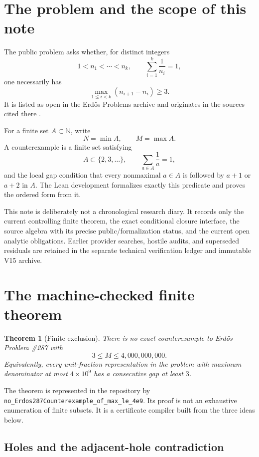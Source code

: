 \documentclass[11pt]{article}
\newtheorem{theorem}{Theorem}[section]
\theoremstyle{definition}
\newcommand{\N}{\mathbb N}
\newcommand{\1}{\mathbf 1}
\begin{document}
\tableofcontents

\section{The problem and the scope of this note}

The public problem asks whether, for distinct integers
\[
1<n_1<\cdots<n_k,\qquad \sum_{i=1}^k\frac1{n_i}=1,
\]
one necessarily has
\[
\max_{1\le i<k}(n_{i+1}-n_i)\ge3.
\]
It is listed as open in the Erd\H{o}s Problems archive and originates in the sources
cited there \cite{ErdosGraham1980,ErdosProblems287}.

For a finite set $A\subset\N$, write
\[
N=\min A,\qquad M=\max A.
\]
A counterexample is a finite set satisfying
\[
A\subset\{2,3,\dots\},\qquad \sum_{a\in A}\frac1a=1,
\]
and the local gap condition that every nonmaximal $a\in A$ is followed by $a+1$ or $a+2$
in $A$.  The Lean development formalizes exactly this predicate and proves the ordered
form from it.

This note is deliberately not a chronological research diary.  It records only the
current controlling finite theorem, the exact conditional closure interface, the
source algebra with its precise public/formalization status, and the current open analytic
obligations.  Earlier
provider searches, hostile audits, and superseded residuals are retained in the separate
technical verification ledger and immutable V15 archive.

\section{The machine-checked finite theorem}

\begin{theorem}[Finite exclusion]
There is no exact counterexample to Erd\H{o}s Problem \#287 with
\[
3\le M\le4{,}000{,}000{,}000.
\]
Equivalently, every unit-fraction representation in the problem with maximum denominator
at most $4\times10^9$ has a consecutive gap at least $3$.
\end{theorem}

The theorem is represented in the repository by
\texttt{no\_Erdos287Counterexample\_of\_max\_le\_4e9}.  Its proof is not an exhaustive
enumeration of finite subsets.  It is a certificate compiler built from the three ideas
below.

\subsection{Holes and the adjacent-hole contradiction}
\end{document}
